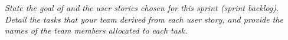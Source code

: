 \emph{State the goal of and the user stories chosen for this sprint (sprint backlog). Detail the tasks that your team derived from each user story, and provide the names of the team members allocated to each task.}